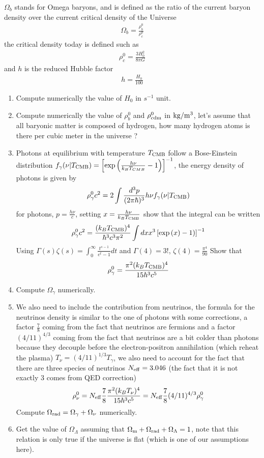 \documentclass[a4paper, 11pt]{article}
\def\ba{\begin{eqnarray}}
\def\ea{\end{eqnarray}}
\begin{document}
$\Omega_{b}$ stands for Omega baryons, and is defined as the ratio of the current baryon density  over the current critical density of the Universe 
\ba
\Omega_{b} = \frac{\rho^{0}_{b}}{\rho^{0}_{c}}  \nonumber
\ea
the critical density today is defined such as
\ba
\rho^{0}_{c} = \frac{3H^{2}_{0}}{8\pi G}
\ea 
and $h$ is the reduced Hubble factor 
\ba
h = \frac{H_{0}}{100}
\ea
\begin{enumerate}
\item Compute numerically the value of $H_{0}$ in $s^{-1}$ unit.
\item Compute numerically the value of $\rho^{0}_{b}$ and $\rho^{0}_{\rm cdm}$ in $\rm{kg}/m^{3}$, let's assume that all baryonic matter is composed of hydrogen, how many hydrogen atoms is there per cubic meter in the universe ?
\item Photons at equilibrium with temperature $T_{\rm CMB}$ follow a Bose-Einstein distribution $f_{\gamma}(\nu | T_{\rm CMB}) = \left[\exp \left(\frac{h\nu}{k_{B}T_{CMB}}-1\right)\right]^{-1}$, the energy density of photons is given by
\ba
\rho^{0}_{\gamma} c^{2}= 2 \int \frac{d^{3}p}{(2\pi \hbar)^{3}} h\nu f_{\gamma}(\nu | T_{\rm CMB}) 
\ea
for photons, $p = \frac{h\nu}{ c}$, setting $x = \frac{h\nu}{k_{B}T_{\rm CMB}}$ show that the integral can be written
\ba
\rho^{0}_{\gamma} c^{2}= \frac{ (k_{B}T_{\rm CMB})^{4}}{\hbar^{3}c^{3}\pi^{2}} \int dx x^{3}  \left[\exp \left(x)-1\right)\right]^{-1}
\ea
Using $\Gamma(s) \zeta(s)  = \int_{0}^{\infty} \frac{t^{s-1}}{e^{t}-1}dt$
and  $\Gamma(4) = 3!$, $\zeta(4) = \frac{\pi^{4}}{90}$
Show that
\ba
\rho^{0}_{\gamma}  =  \frac{\pi^{2} (k_{B}T_{\rm CMB})^{4}}{15 \hbar^{3}c^{5}}
\ea
\item Compute $\Omega_{\gamma}$  numerically.
\item We also need to include the contribution from neutrinos, the formula for the neutrinos density is similar to the one of photons with some corrections, a factor $\frac{7}{8}$ coming from the fact that neutrinos are fermions and a factor $(4/11)^{4/3}$ coming from the fact that neutrinos are a bit colder than photons because they decouple before the electron-positron annihilation (which reheat the plasma) $T_{\nu} = (4/11)^{1/3} T_{\gamma}$, we also need to account for the fact that there are three species of neutrinos $N_{\rm eff} =3.046$ (the fact that it is not exactly 3 comes from QED correction)
\ba
\rho^{0}_{\nu}  =  N_{\rm eff}  \frac{7}{8} \frac{\pi^{2} (k_{B}T_{\nu})^{4}}{15 \hbar^{3}c^{5}} = N_{\rm eff}  \frac{7}{8}  (4/11)^{4/3} \rho^{0}_{\gamma}
\ea
Compute $\Omega_{\rm rad} = \Omega_{\gamma} + \Omega_{\nu}$ numerically.
\item Get the value of $\Omega_{\Lambda}$ assuming that  $\Omega_{\rm m} + \Omega_{\rm rad} + \Omega_{\Lambda} = 1$, note that this relation is only true if the universe is flat (which is one of our assumptions here).  

\end{enumerate}
\end{document}
